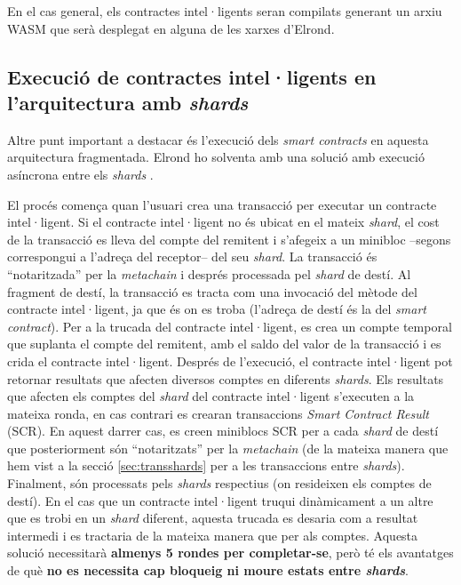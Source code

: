 \documentclass[11pt,a4paper]{article}
\begin{document}
En el cas general, els contractes intel·ligents seran compilats generant un arxiu WASM que serà desplegat en alguna de les xarxes d'Elrond. 

\subsection{Execució de contractes intel·ligents en l'arquitectura amb \textit{shards}}

Altre punt important a destacar és l'execució dels \textit{smart contracts} en aquesta arquitectura fragmentada. Elrond ho solventa amb una solució amb execució asíncrona entre els \textit{shards} \cite{elrond2019}. 

El procés comença quan l'usuari crea una transacció per executar un contracte intel·ligent. Si el contracte intel·ligent no és ubicat en el mateix \textit{shard}, el cost de la transacció es lleva del compte del remitent i s'afegeix a un minibloc –segons correspongui a l'adreça del receptor– del seu \textit{shard}. La transacció és ``notaritzada'' per la \textit{metachain} i després processada pel \textit{shard} de destí. Al fragment de destí, la transacció es tracta com una invocació del mètode del contracte intel·ligent, ja que és on es troba (l'adreça de destí és la del \textit{smart contract}). Per a la trucada del contracte intel·ligent, es crea un compte temporal que suplanta el compte del remitent, amb el saldo del valor de la transacció i es crida el contracte intel·ligent. Després de l'execució, el contracte intel·ligent pot retornar resultats que afecten diversos comptes en diferents \textit{shards}. Els resultats que afecten els comptes del \textit{shard} del contracte intel·ligent s'executen a la mateixa ronda, en cas contrari es crearan transaccions \textit{Smart Contract Result} (SCR). En aquest darrer cas, es creen miniblocs SCR per a cada \textit{shard} de destí que posteriorment són ``notaritzats'' per la \textit{metachain} (de la mateixa manera que hem vist a la secció \ref{sec:transshards} per a les transaccions entre \textit{shards}). Finalment, són processats pels \textit{shards} respectius (on resideixen els comptes de destí). En el cas que un contracte intel·ligent truqui dinàmicament a un altre que es trobi en un \textit{shard} diferent, aquesta trucada es desaria com a resultat intermedi i es tractaria de la mateixa manera que per als comptes. Aquesta solució necessitarà \textbf{almenys 5 rondes per completar-se}, però té els avantatges de què \textbf{no es necessita cap bloqueig ni moure estats entre \textit{shards}}.
\end{document}

